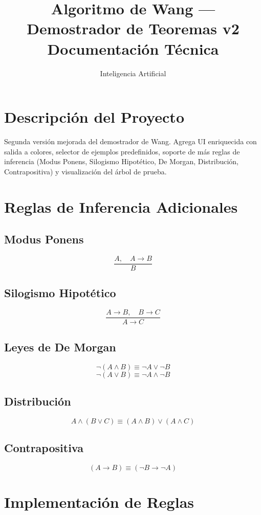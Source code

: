 \documentclass[12pt,a4paper]{article}
\title{\textbf{Algoritmo de Wang --- Demostrador de Teoremas v2}\\
  \large Documentación Técnica}
\author{Inteligencia Artificial}
\date{}
\begin{document}
\maketitle
\tableofcontents
\newpage

\section{Descripción del Proyecto}
Segunda versión mejorada del demostrador de Wang. Agrega UI enriquecida con salida a colores, selector de ejemplos predefinidos, soporte de más reglas de inferencia (Modus Ponens, Silogismo Hipotético, De Morgan, Distribución, Contrapositiva) y visualización del árbol de prueba.

\section{Reglas de Inferencia Adicionales}

\subsection{Modus Ponens}
\[ \frac{A, \quad A \rightarrow B}{B} \]

\subsection{Silogismo Hipotético}
\[ \frac{A \rightarrow B, \quad B \rightarrow C}{A \rightarrow C} \]

\subsection{Leyes de De Morgan}
\[ \neg(A \wedge B) \equiv \neg A \vee \neg B \]
\[ \neg(A \vee B) \equiv \neg A \wedge \neg B \]

\subsection{Distribución}
\[ A \wedge (B \vee C) \equiv (A \wedge B) \vee (A \wedge C) \]

\subsection{Contrapositiva}
\[ (A \rightarrow B) \equiv (\neg B \rightarrow \neg A) \]

\section{Implementación de Reglas}
\end{document}
